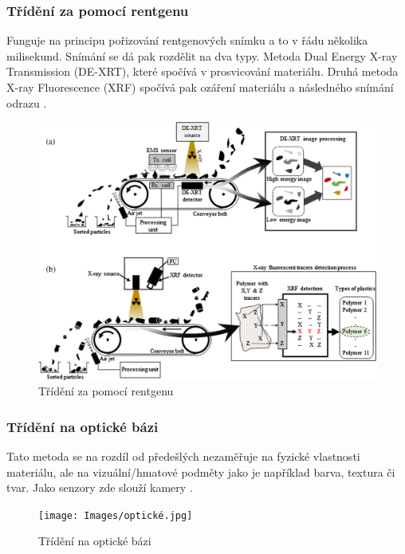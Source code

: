 \documentclass[a4paper,10pt]{article}
\theoremstyle{definition}
\begin{document}
\subsubsection*{Třídění za pomocí rentgenu}
Funguje na principu pořizování rentgenových snímku a to v řádu několika milisekund. Snímání se dá pak rozdělit na dva typy. Metoda Dual Energy X-ray Transmission (DE-XRT), které spočívá v prosvicování materiálu. Druhá metoda X-ray Fluorescence (XRF) spočívá pak ozáření materiálu a následného snímání odrazu \cite{GUNDUPALLI201756}.

\begin{figure}[H]
\begin{center}
\includegraphics[scale=0.75]{Images/X-ray.jpg}
\caption{Třídění za pomocí rentgenu \cite{GUNDUPALLI201756}}
\label{fig:1}
\end{center}
\end{figure}

\newpage
\subsubsection*{Třídění na optické bázi}
Tato metoda se na rozdíl od předešlých nezaměřuje na fyzické vlastnosti materiálu, ale na vizuální/hmatové podměty jako je například barva, textura či tvar. Jako senzory zde slouží kamery \cite{GUNDUPALLI201756}.

\begin{figure}[H]
\begin{center}
\texttt{[image: Images/optické.jpg]}
\caption{Třídění na optické bázi \cite{GUNDUPALLI201756}}
\label{fig:1}
\end{center}
\end{figure}
\end{document}
